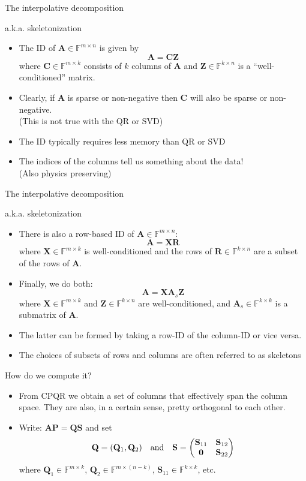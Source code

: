 \documentclass{beamer}
\newcommand{\bgk}[1]{\boldsymbol{#1}}
\newcommand{\bzero}{\bgk{0}}
\newcommand{\bvec}[1]{\mathbf{#1}}
\newcommand{\vA}{\bvec{A}}
\newcommand{\vC}{\bvec{C}}
\newcommand{\vP}{\bvec{P}}
\newcommand{\vQ}{\bvec{Q}}
\newcommand{\vR}{\bvec{R}}
\newcommand{\vS}{\bvec{S}}
\newcommand{\vX}{\bvec{X}}
\newcommand{\vZ}{\bvec{Z}}
\newcommand{\bitem}{\item[$\bullet$]}
\begin{document}
\begin{frame}{The interpolative decomposition\\ \begin{small}
a.k.a. skeletonization
\end{small}}

\begin{itemize}
    \bitem The ID of $\vA \in \mathbb{F}^{m \times n}$ is given by
    $$
    \vA = \vC \vZ
    $$
    where $\vC\in\mathbb{F}^{m \times k}$ consists of $k$ columns of $\vA$ and $\vZ\in\mathbb{F}^{k \times n}$ is a ``well-conditioned'' matrix. 
    \bitem Clearly, if $\vA$ is sparse or non-negative then $\vC$ will also be sparse or non-negative. \\
    (This is not true with the QR or SVD)
    \bitem The ID typically requires less memory than QR or SVD
    \bitem The indices of the columns tell us something about the data!\\
    (Also physics preserving)
\end{itemize}
\end{frame}

\begin{frame}{The interpolative decomposition\\ \begin{small}
a.k.a. skeletonization
\end{small}}
\begin{itemize}
    \bitem There is also a row-based ID of $\vA \in \mathbb{F}^{m \times n}$:
    $$
    \vA = \vX \vR
    $$
    where $\vX\in \mathbb{F}^{m \times k}$ is well-conditioned and the rows of $\vR\in \mathbb{F}^{k \times n}$ are a subset of the rows of $\vA$.
    \bitem Finally, we do both:
    $$
    \vA = \vX \vA_s \vZ
    $$
    where $\vX\in \mathbb{F}^{m \times k}$ and $\vZ\in \mathbb{F}^{k \times n}$ are well-conditioned, and $\vA_s \in \mathbb{F}^{k \times k}$ is a submatrix of $\vA$.
    \bitem The latter can be formed by taking a row-ID of the column-ID or vice versa. 
    \bitem The choices of subsets of rows and columns are often referred to as skeletons
\end{itemize}
\end{frame}

\begin{frame}{How do we compute it?}

\begin{itemize}
    \bitem From CPQR we obtain a set of columns that effectively span the column space. They are also, in a certain sense, pretty orthogonal to each other.
    \bitem Write: $\vA \vP = \vQ\vS$ and set
    $$
    \vQ = (\vQ_1, \vQ_2)
    \quad {\rm and} \quad
    \vS = \begin{pmatrix}
    \vS_{11} & \vS_{12}\\
    \bzero & \vS_{22}
    \end{pmatrix}
    $$
    where $\vQ_1 \in \mathbb{F}^{m \times k}$, $\vQ_2 \in \mathbb{F}^{m \times (n -k)}$, $\vS_{11} \in \mathbb{F}^{k \times k}$, etc.
\end{itemize}
    
\end{frame}
\end{document}
